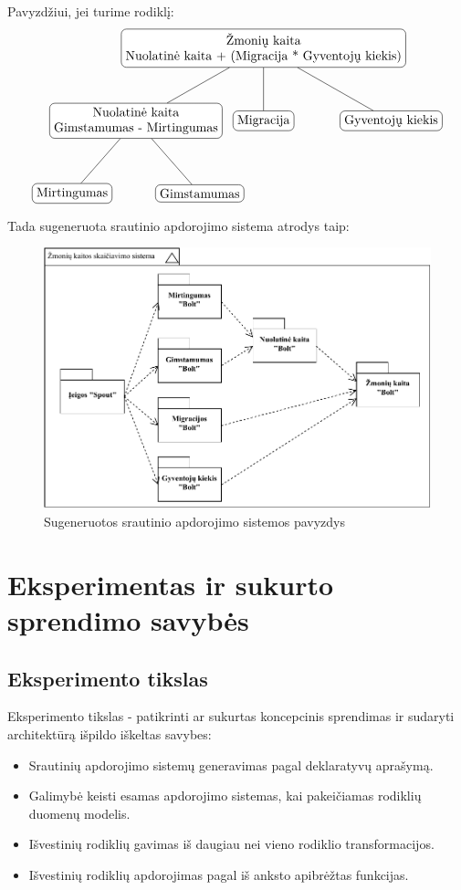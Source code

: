 \documentclass{VUMIFPSbakalaurinis}
\begin{document}
Pavyzdžiui, jei turime rodiklį:     
\[
    \begin{tikzpicture}[sibling distance=10em,
        level distance=2cm,
        every node/.style = {shape=rectangle, rounded corners,	
                             draw, align=center,	
                             top color=white, bottom color=white}]	
        \node{Žmonių kaita\\Nuolatinė kaita + (Migracija * Gyventojų kiekis)}
                child { node {Nuolatinė kaita\\Gimstamumas - Mirtingumas} 
                        child {node {Mirtingumas}}
                        child {node {Gimstamumas}} }	
                child { node {Migracija} } 	
                child { node {Gyventojų kiekis} }; 	
    \end{tikzpicture} 	
\]
Tada sugeneruota srautinio apdorojimo sistema atrodys taip:
\begin{figure}[H]
    \centering
    \includegraphics[width=1\textwidth]{img/generuota_sistema.pdf}
    \caption{Sugeneruotos srautinio apdorojimo sistemos pavyzdys}
    \label{img:example}
\end{figure}

\section{Eksperimentas ir sukurto sprendimo savybės}

\subsection{Eksperimento tikslas}

Eksperimento tikslas - patikrinti ar sukurtas koncepcinis sprendimas ir sudaryti architektūrą išpildo iškeltas savybes:
\begin{itemize}
    \item Srautinių apdorojimo sistemų generavimas pagal deklaratyvų aprašymą.
    \item Galimybė keisti esamas apdorojimo sistemas, kai pakeičiamas rodiklių duomenų modelis.
    \item Išvestinių rodiklių gavimas iš daugiau nei vieno rodiklio transformacijos.
    \item Išvestinių rodiklių apdorojimas pagal iš anksto apibrėžtas funkcijas.
\end{itemize}  
\end{document}
